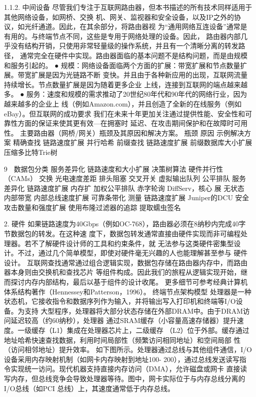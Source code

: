 1.1.2.   中间设备
尽管我们专注于互联网路由器，但本书描述的所有技术同样适用于其他网络设备，如网桥、交换
机、网关、监视器和安全设备，以及IP之外的协议，如光纤通道。因此，在其余部分，将路由器视
为“通用网络互连设备”通常是有用的。与终端节点不同，这些是专用于网络处理的设备。因此，
路由器内部几乎没有结构开销，只使用非常轻量级的操作系统，并且有一个清晰分离的转发路径，
通常完全在硬件中实现。路由器面临的基本问题不是结构问题，而是由规模和服务引起的。
 ● 规模：网络设备面临两个方面的扩展：带宽扩展和节点数量扩展。带宽扩展是因为光链路不断
   变快。并且由于各种新应用的出现，互联网流量持续增长。节点数量扩展是因为随着更多企业
   上线，连接到互联网的端点越来越多。
 ● 服务：速度和规模的需求推动了20世纪80年代和90年代的网络行业，因为越来越多的企业上
   线（例如Amazon.com），并且创造了全新的在线服务（例如eBay）。但互联网的成功要求
   我们在未来十年更加关注通过提供性能、安全性和可靠性方面的保证来使其更有效—在拥塞时
   延迟、在攻击期间保护和在故障时可用性。
主要路由器（网桥/网关）瓶颈及其原因和解决方案。
 瓶颈       原因                  示例解决方案
 精确查找     链路速度扩展              并行哈希
 前缀查找     链路速度扩展 前缀数据库大小扩展 压缩多比特Trie树

                                                    9
 数据包分类    服务差异化 链路速度和大小扩展    决策树算法 硬件并行性（CAMs）
 交换       光电速度差距 排头阻塞        交叉开关 虚拟输出队列
 公平排队     服务差异化 链路速度扩展 内存扩   加权公平排队 赤字轮询 DiffServ，核心
          展                  无状态
 内部带宽     内部总线速度扩展           可靠条带化
 测量       链路速度扩展             Juniper的DCU
 安全       攻击数量和强度扩展          使用布隆过滤器的追踪 提取蠕虫签名

2.   硬件
如果链路速度为40Gbps（例如OC-768），路由器必须在8纳秒内完成40字节数据包的转发。在这种速
度下，数据包转发通常直接由硬件实现而非可编程处理器。若不了解硬件设计师的工具和约束条件，就
无法参与这类硬件密集型设计。不过，通过几个简单模型，即使对硬件毫无兴趣的人也能理解甚至参与
硬件设计。
互联网查找通常通过组合逻辑实现，数据包存储在路由器内存中，而路由器本身则由交换机和查找芯片
等组件构成。因此我们的旅程从逻辑实现开始，继而探讨内存内部结构，最后以基于组件的设计收尾。
更多细节可参考经典计算机体系结构著作（Hennessey和Patterson，1996）。
终端节点架构模型
处理器是一种状态机，它接收指令和数据序列作为输入，并将输出写入打印机和终端等I/O设备。为支持
大型程序，处理器将大部分状态存储在外部DRAM中。由于DRAM访问延迟较高（约60纳秒），处理器
通过SRAM缓存（小容量高速存储器）提升速度。一级缓存（L1）集成在处理器芯片上，二级缓存
（L2）位于外部。缓存通过地址哈希快速查找数据，利用时间局部性（频繁访问相同地址）和空间局部
性（访问相邻地址）提升效率。
如下图所示。处理器通过总线与其他组件通信，I/O设备采用内存映射机制（如网卡内存映射到地址100-
200），通过总线发送读写指令实现统一访问。现代机器支持直接内存访问（DMA），允许磁盘或网卡
直接读写内存，但总线竞争会导致处理器等待。图中，网卡实际位于与内存总线分离的I/O总线（如PCI
总线）上，其速度通常低于内存总线。




